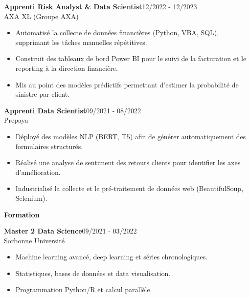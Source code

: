\documentclass{article}
\begin{document}
\begin{paracol}{2}
\colorbox{maincolor}{%
  \begin{minipage}{\linewidth}
    \noindent
    \textbf{Apprenti Risk Analyst \& Data Scientist}\hfill 12/2022 - 12/2023\\
    AXA XL (Groupe AXA)\\[-0.3em]
    \begin{itemize}[leftmargin=*]
      \item Automatisé la collecte de données financières (Python, VBA, SQL), supprimant les tâches manuelles répétitives. \item Construit des tableaux de bord Power BI pour le suivi de la facturation et le reporting à la direction financière. \item Mis au point des modèles prédictifs permettant d’estimer la probabilité de sinistre par client.
    \end{itemize}
  \end{minipage}}

\vspace{3mm}

\colorbox{maincolor}{%
  \begin{minipage}{\linewidth}
    \noindent
    \textbf{Apprenti Data Scientist}\hfill 09/2021 - 08/2022\\
    Prepaya\\[-0.3em]
    \begin{itemize}[leftmargin=*]
      \item Déployé des modèles NLP (BERT, T5) afin de générer automatiquement des formulaires structurés. \item Réalisé une analyse de sentiment des retours clients pour identifier les axes d’amélioration. \item Industrialisé la collecte et le pré-traitement de données web (BeautifulSoup, Selenium).
    \end{itemize}
  \end{minipage}}   %

\vspace{8mm}

\textcolor{black}{\Large \textbf{Formation}} \\[2pt]
\colorbox{maincolor}{%
  \begin{minipage}{\linewidth}
    \noindent
    \textbf{Master 2 Data Science}\hfill 09/2021 - 03/2022\\
    Sorbonne Université\\[-0.3em]
    \begin{itemize}[leftmargin=*]
      \item Machine learning avancé, deep learning et séries chronologiques. \item Statistiques, bases de données et data visualisation. \item Programmation Python/R et calcul parallèle.
    \end{itemize}
  \end{minipage}}


\end{paracol}
\end{document}
